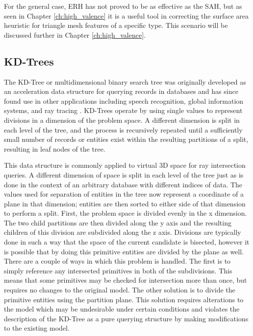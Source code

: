 For the general case, ERH has not proved to be as effective as the SAH, but as
seen in Chapter \ref{ch:high_valence} it is a useful tool in correcting the
surface area heuristic for triangle mesh features of a specific type. This
scenario will be discussed further in Chapter \ref{ch:high_valence}.

\subsection{KD-Trees}
\label{subsec:kd-trees}
The KD-Tree or multidimensional binary search tree was originally developed as
an acceleration data structure for querying records in databases and has since
found use in other applications including speech recognition, global information
systems, and ray tracing \cite{Bentley_1975}. KD-Trees operate by using single
values to represent divisions in a dimension of the problem space. A different
dimension is split in each level of the tree, and the process is recursively
repeated until a sufficiently small number of records or entities exist within
the resulting partitions of a split, resulting in leaf nodes of the tree.

This data structure is commonly applied to virtual 3D space for ray intersection
queries. A different dimension of space is split in each level of the tree just
as is done in the context of an arbitrary database with different indices of
data. The values used for separation of entities in the tree now represent a
coordinate of a plane in that dimension; entities are then sorted to either side
of that dimension to perform a split. First, the problem space is divided evenly
in the x dimension. The two child partitions are then divided along the y axis
and the resulting children of this division are subdivided along the z
axis. Divisions are typically done in such a way that the space of the current
candidate is bisected, however it is possible that by doing this primitive
entities are divided by the plane as well. There are a couple of ways in which
this problem is handled. The first is to simply reference any intersected
primitives in both of the subdivisions. This means that some primitives may be
checked for intersection more than once, but requires no changes to the original
model. The other solution is to divide the primitive entities using the
partition plane.  This solution requires alterations to the model which may be
undesirable under certain conditions and violates the description of the KD-Tree
as a pure querying structure by making modifications to the existing model.

